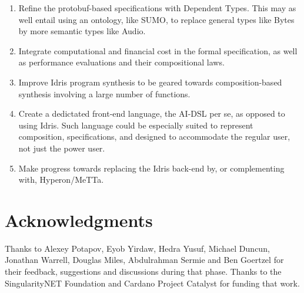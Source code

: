 \documentclass[]{report}
\begin{document}
\begin{enumerate}
\item Refine the protobuf-based specifications with Dependent Types.
  This may as well entail using an ontology, like SUMO, to replace
  general types like Bytes by more semantic types like Audio.
\item Integrate computational and financial cost in the formal
  specification, as well as performance evaluations and their
  compositional laws.
\item Improve Idris program synthesis to be geared towards
  composition-based synthesis involving a large number of functions.
\item Create a dedictated front-end language, the AI-DSL per se, as
  opposed to using Idris.  Such language could be especially suited to
  represent composition, specifications, and designed to accommodate
  the regular user, not just the power user.
\item Make progress towards replacing the Idris back-end by, or
  complementing with, Hyperon/MeTTa.
\end{enumerate}

\section{Acknowledgments}

Thanks to Alexey Potapov, Eyob Yirdaw, Hedra Yusuf, Michael Duncun,
Jonathan Warrell, Douglas Miles, Abdulrahman Sermie and Ben Goertzel
for their feedback, suggestions and discussions during that phase.
Thanks to the SingularityNET Foundation and Cardano Project Catalyst
for funding that work.




\end{document}
